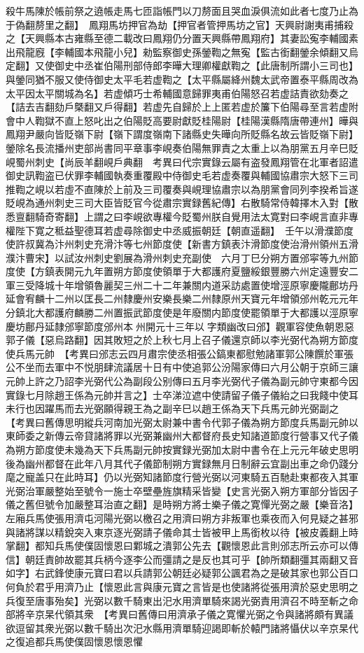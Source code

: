 殺牛馬陳於帳前祭之遶帳走馬七匝詣帳門以刀剺面且哭血淚俱流如此者七度乃止為于偽翻剺里之翻】　鳳翔馬坊押官為劫【押官者管押馬坊之官】天興尉謝夷甫捕殺之【天興縣本古雍縣至德二載改曰鳳翔仍分置天興縣帶鳳翔府】其妻訟寃李輔國素出飛龍廐【李輔國本飛龍小兒】勑監察御史孫鎣鞫之無寃【監古銜翻鎣余傾翻又烏定翻】又使御史中丞崔伯陽刑部侍郎李曄大理卿權獻鞫之【此唐制所謂小三司也】與鎣同猶不服又使侍御史太平毛若虚鞫之【太平縣屬絳州魏太武帝置泰平縣周改為太平因太平關城為名】若虚傾巧士希輔國意歸罪夷甫伯陽怒召若虚詰責欲劾奏之【詰去吉翻劾戶槩翻又戶得翻】若虚先自歸於上上匿若虚於簾下伯陽尋至言若虚附會中人鞫獄不直上怒叱出之伯陽貶高要尉獻貶桂陽尉【桂陽漢縣隋唐帶連州】曄與鳳翔尹嚴向皆貶嶺下尉【嶺下謂度嶺南下諸縣史失曄向所貶縣名故云皆貶嶺下尉】鎣除名長流播州吏部尚書同平章事李峴奏伯陽無罪責之太重上以為朋黨五月辛巳貶峴蜀州刺史【尚辰羊翻峴戶典翻　考異曰代宗實錄云屬有盗發鳳翔管在北軍者詔遣御史訊鞫盗已伏罪李輔國執奏重覆殿中侍御史毛若虚奏覆與輔國協肅宗大怒下三司推鞫之峴以若虛不直陳於上前及三司覆奏與峴理協肅宗以為朋黨會同列李揆希旨遂貶峴為通州刺史三司大臣皆貶官今從肅宗實録舊紀傳】右散騎常侍韓擇木入對【散悉亶翻騎奇寄翻】上謂之曰李峴欲專權今貶蜀州朕自覺用法太寛對曰李峴言直非專權陛下寛之秪益聖德耳若虚尋除御史中丞威振朝廷【朝直遥翻】　壬午以滑濮節度使許叔冀為汴州刺史充滑汴等七州節度使【新書方鎮表汴滑節度使治滑州領州五滑濮汴曹宋】以試汝州刺史劉展為滑州刺史充副使　六月丁巳分朔方置邠寜等九州節度使【方鎮表開元九年置朔方節度使領單于大都護府夏鹽綏銀豐勝六州定遠豐安二軍三受降城十年增領魯麗契三州二十二年兼關内道采訪處置使增涇原寧慶隴鄜坊丹延會宥麟十二州以匡長二州隸慶州安樂長樂二州隸原州天寶元年增領邠州乾元元年分鎮北大都護府麟勝二州置振武節度使是年廢關内節度使罷領單于大都護以涇原寧慶坊鄜丹延隸邠寧節度邠州本州開元十三年以字類幽改曰邠】觀軍容使魚朝恩惡郭子儀【惡烏路翻】因其敗短之於上秋七月上召子儀還京師以李光弼代為朔方節度使兵馬元帥　【考異曰邠志云四月肅宗使丞相張公鎬東都慰勉諸軍郭公陳饌於軍張公不坐而去軍中不悦朋肆流議居十日有中使追郭公汾陽家傳曰六月公朝于京師三讓元帥上許之乃詔李光弼代公為副段公别傳曰五月李光弼代子儀為副元帥守東都今因實錄七月除趙王係為元帥并言之】士卒涕泣遮中使請留子儀子儀紿之曰我餞中使耳未行也因躍馬而去光弼願得親王為之副辛巳以趙王係為天下兵馬元帥光弼副之　【考異曰舊傳思明縱兵河南加光弼太尉兼中書令代郭子儀為朔方節度兵馬副元帥以東師委之新傳云帝貸諸將罪以光弼兼幽州大都督府長史知諸道節度行營事又代子儀為朔方節度使未幾為天下兵馬副元帥按實録光弼加太尉中書令在上元元年破史思明後為幽州都督在此年八月其代子儀節制朔方實録無月日制辭云宜副出車之命仍踐分麾之寵盖只在此時耳】仍以光弼知諸節度行營光弼以河東騎五百馳赴東都夜入其軍光弼治軍嚴整始至號令一施士卒壁壘旌旗精采皆變【史言光弼入朔方軍部分皆因子儀之舊但號令加嚴整耳治直之翻】是時朔方將士樂子儀之寛憚光弼之嚴【樂音洛】左廂兵馬使張用濟屯河陽光弼以檄召之用濟曰朔方非叛軍也乘夜而入何見疑之甚邪與諸將謀以精銳突入東京逐光弼請子儀命其士皆被甲上馬銜枚以待【被皮義翻上時掌翻】都知兵馬使僕固懷恩曰鄴城之潰郭公先去【觀懷恩此言則邠志所云亦可以傳信】朝廷責帥故罷其兵柄今逐李公而彊請之是反也其可乎【帥所類翻彊其兩翻又音如字】右武鋒使康元寶曰君以兵請郭公朝廷必疑郭公諷君為之是破其家也郭公百口何負於君乎用濟乃止【懷恩此言與康元寶之言皆是也使諸將從張用濟於惡史思明之兵復至唐事殆矣】光弼以數千騎東出汜水用濟單騎來謁光弼責用濟召不時至斬之命部將辛京杲代領其衆　【考異曰舊傳曰用濟承子儀之寛懼光弼之令與諸將頗有異議欲逗留其衆光弼以數千騎出次汜水縣用濟單騎迎謁即斬於轅門諸將懾伏以辛京杲代之復追都兵馬使僕固懷恩懷恩懼